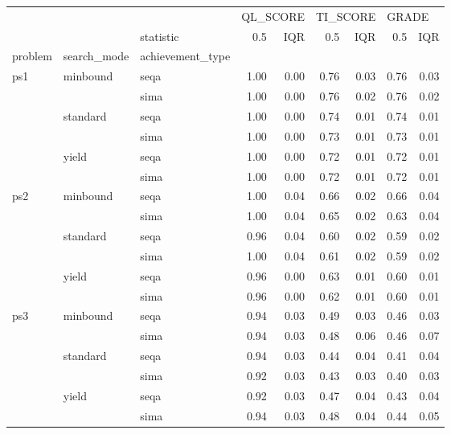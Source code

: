 \begin{tabular}{lllrrrrrr}
\toprule
    &       & {} & \multicolumn{2}{l}{QL\_SCORE} & \multicolumn{2}{l}{TI\_SCORE} & \multicolumn{2}{l}{GRADE} \\
    &       & statistic &      0.5 &  IQR &      0.5 &  IQR &   0.5 &  IQR \\
problem & search\_mode & achievement\_type &          &      &          &      &       &      \\
\midrule
ps1 & minbound & seqa &     1.00 & 0.00 &     0.76 & 0.03 &  0.76 & 0.03 \\
    &       & sima &     1.00 & 0.00 &     0.76 & 0.02 &  0.76 & 0.02 \\
    & standard & seqa &     1.00 & 0.00 &     0.74 & 0.01 &  0.74 & 0.01 \\
    &       & sima &     1.00 & 0.00 &     0.73 & 0.01 &  0.73 & 0.01 \\
    & yield & seqa &     1.00 & 0.00 &     0.72 & 0.01 &  0.72 & 0.01 \\
    &       & sima &     1.00 & 0.00 &     0.72 & 0.01 &  0.72 & 0.01 \\
ps2 & minbound & seqa &     1.00 & 0.04 &     0.66 & 0.02 &  0.66 & 0.04 \\
    &       & sima &     1.00 & 0.04 &     0.65 & 0.02 &  0.63 & 0.04 \\
    & standard & seqa &     0.96 & 0.04 &     0.60 & 0.02 &  0.59 & 0.02 \\
    &       & sima &     1.00 & 0.04 &     0.61 & 0.02 &  0.59 & 0.02 \\
    & yield & seqa &     0.96 & 0.00 &     0.63 & 0.01 &  0.60 & 0.01 \\
    &       & sima &     0.96 & 0.00 &     0.62 & 0.01 &  0.60 & 0.01 \\
ps3 & minbound & seqa &     0.94 & 0.03 &     0.49 & 0.03 &  0.46 & 0.03 \\
    &       & sima &     0.94 & 0.03 &     0.48 & 0.06 &  0.46 & 0.07 \\
    & standard & seqa &     0.94 & 0.03 &     0.44 & 0.04 &  0.41 & 0.04 \\
    &       & sima &     0.92 & 0.03 &     0.43 & 0.03 &  0.40 & 0.03 \\
    & yield & seqa &     0.92 & 0.03 &     0.47 & 0.04 &  0.43 & 0.04 \\
    &       & sima &     0.94 & 0.03 &     0.48 & 0.04 &  0.44 & 0.05 \\
\bottomrule
\end{tabular}
